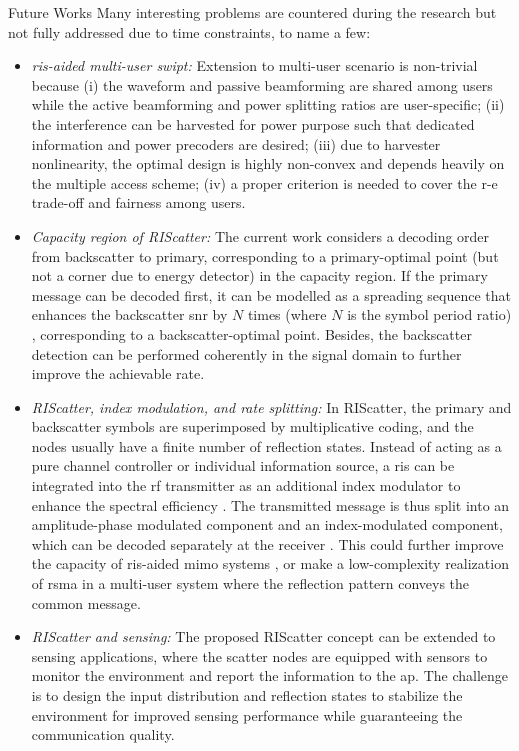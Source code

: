 \begin{section}{Future Works}
	Many interesting problems are countered during the research but not fully addressed due to time constraints, to name a few:
	\begin{itemize}
		\item \emph{\gls{ris}-aided multi-user \gls{swipt}:} Extension to multi-user scenario is non-trivial because (i) the waveform and passive beamforming are shared among users while the active beamforming and power splitting ratios are user-specific; (ii) the interference can be harvested for power purpose such that dedicated information and power precoders are desired; (iii) due to harvester nonlinearity, the optimal design is highly non-convex and depends heavily on the multiple access scheme; (iv) a proper criterion is needed to cover the \gls{r-e} trade-off and fairness among users.
		\item \emph{Capacity region of RIScatter:} The current work considers a decoding order from backscatter to primary, corresponding to a primary-optimal point (but not a corner due to energy detector) in the capacity region.
		If the primary message can be decoded first, it can be modelled as a spreading sequence that enhances the backscatter \gls{snr} by $N$ times (where $N$ is the symbol period ratio) \cite{Long2020a}, corresponding to a backscatter-optimal point.
		Besides, the backscatter detection can be performed coherently in the signal domain to further improve the achievable rate.
		\item \emph{RIScatter, index modulation, and rate splitting:} In RIScatter, the primary and backscatter symbols are superimposed by multiplicative coding, and the nodes usually have a finite number of reflection states. Instead of acting as a pure channel controller or individual information source, a \gls{ris} can be integrated into the \gls{rf} transmitter as an additional index modulator to enhance the spectral efficiency \cite{Basar2020}.
		The transmitted message is thus split into an amplitude-phase modulated component and an index-modulated component, which can be decoded separately at the receiver \cite{Zhong2018}. This could further improve the capacity of \gls{ris}-aided \gls{mimo} systems \cite{Ye2022}, or make a low-complexity realization of \gls{rsma} \cite{Mao2018} in a multi-user system where the reflection pattern conveys the common message.
		\item \emph{RIScatter and sensing:} The proposed RIScatter concept can be extended to sensing applications, where the scatter nodes are equipped with sensors to monitor the environment and report the information to the \gls{ap}. The challenge is to design the input distribution and reflection states to stabilize the environment for improved sensing performance while guaranteeing the communication quality.

\end{itemize}
\end{section}
